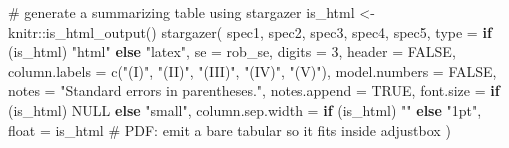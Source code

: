\documentclass[
  12pt,
  letterpaper,
]{scrbook}
\newenvironment{Shaded}{\begin{snugshade}}{\end{snugshade}}
\newcommand{\AttributeTok}[1]{\textcolor[rgb]{0.40,0.45,0.13}{#1}}
\newcommand{\CommentTok}[1]{\textcolor[rgb]{0.37,0.37,0.37}{#1}}
\newcommand{\ConstantTok}[1]{\textcolor[rgb]{0.56,0.35,0.01}{#1}}
\newcommand{\ControlFlowTok}[1]{\textcolor[rgb]{0.00,0.23,0.31}{\textbf{#1}}}
\newcommand{\DecValTok}[1]{\textcolor[rgb]{0.68,0.00,0.00}{#1}}
\newcommand{\FunctionTok}[1]{\textcolor[rgb]{0.28,0.35,0.67}{#1}}
\newcommand{\NormalTok}[1]{\textcolor[rgb]{0.00,0.23,0.31}{#1}}
\newcommand{\OtherTok}[1]{\textcolor[rgb]{0.00,0.23,0.31}{#1}}
\newcommand{\SpecialCharTok}[1]{\textcolor[rgb]{0.37,0.37,0.37}{#1}}
\newcommand{\StringTok}[1]{\textcolor[rgb]{0.13,0.47,0.30}{#1}}
\theoremstyle{plain}
\theoremstyle{definition}
\theoremstyle{remark}
\begin{document}
\begin{Shaded}
\begin{Highlighting}[]
\CommentTok{\# generate a summarizing table using stargazer}
\NormalTok{is\_html }\OtherTok{\textless{}{-}}\NormalTok{ knitr}\SpecialCharTok{::}\FunctionTok{is\_html\_output}\NormalTok{()}
\FunctionTok{stargazer}\NormalTok{(}
\NormalTok{    spec1, spec2, spec3, spec4, spec5,}
    \AttributeTok{type =} \ControlFlowTok{if}\NormalTok{ (is\_html) }\StringTok{"html"} \ControlFlowTok{else} \StringTok{"latex"}\NormalTok{,}
    \AttributeTok{se =}\NormalTok{ rob\_se,}
    \AttributeTok{digits =} \DecValTok{3}\NormalTok{,}
    \AttributeTok{header =} \ConstantTok{FALSE}\NormalTok{,}
    \AttributeTok{column.labels =} \FunctionTok{c}\NormalTok{(}\StringTok{"(I)"}\NormalTok{, }\StringTok{"(II)"}\NormalTok{, }\StringTok{"(III)"}\NormalTok{, }\StringTok{"(IV)"}\NormalTok{, }\StringTok{"(V)"}\NormalTok{),}
    \AttributeTok{model.numbers =} \ConstantTok{FALSE}\NormalTok{,}
    \AttributeTok{notes =} \StringTok{"Standard errors in parentheses."}\NormalTok{,}
    \AttributeTok{notes.append =} \ConstantTok{TRUE}\NormalTok{,}
    \AttributeTok{font.size =} \ControlFlowTok{if}\NormalTok{ (is\_html) }\ConstantTok{NULL} \ControlFlowTok{else} \StringTok{"small"}\NormalTok{,}
    \AttributeTok{column.sep.width =} \ControlFlowTok{if}\NormalTok{ (is\_html) }\StringTok{""} \ControlFlowTok{else} \StringTok{"1pt"}\NormalTok{,}
    \AttributeTok{float =}\NormalTok{ is\_html   }\CommentTok{\# PDF: emit a bare tabular so it fits inside adjustbox}
\NormalTok{)}
\end{Highlighting}
\end{Shaded}
\end{document}
